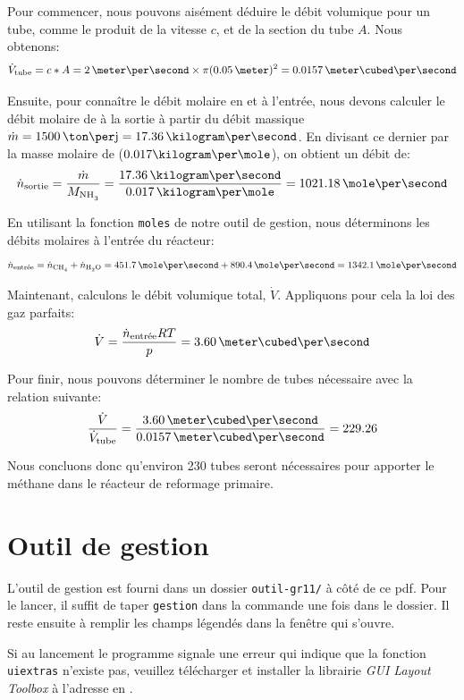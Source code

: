 Pour commencer, nous pouvons aisément déduire le débit volumique pour un tube,
comme le produit de la vitesse $c$, et de la section du tube $A$.
Nous obtenons:
\begin{equation*}
\dot{V}\ind{tube} = c*A = 2\,\meter\per\second \times \pi(0.05\,\meter)^2
= 0.0157\,\meter\cubed\per\second
\end{equation*}

Ensuite, pour connaître le débit molaire en  et  à l'entrée, nous devons calculer le débit molaire de  à la sortie
à partir du débit massique $\dot{m} = 1500\,\ton\per\jour = 17.36\,\kilogram\per\second$.
En divisant ce dernier par la masse molaire de  ($0.017\kilogram\per\mole$),
on obtient un débit de:
\begin{equation*}
\dot{n}\ind{sortie} = \frac{\dot{m}}{M_{\ce{NH3}}}
= \frac{17.36\,\kilogram\per\second}{0.017\,\kilogram\per\mole}
= 1021.18\,\mole\per\second
\end{equation*}

En utilisant la fonction \texttt{moles} de notre outil de gestion,
nous déterminons les débits molaires à l'entrée du réacteur:
\begin{equation*}
\dot{n}\ind{entrée} =  \dot{n}\ind{\ce{CH4}}+ \dot{n}\ind{\ce{H2O}}=451.7\,\mole\per\second + 890.4\,\mole\per\second = 1342.1 \,\mole\per\second
\end{equation*}

Maintenant, calculons le débit volumique total, $\dot{V}$.
Appliquons pour cela la loi des gaz parfaits:
\begin{equation*}
\dot{V} = \frac{\dot{n}\ind{entrée}RT}{p} = 3.60\,\meter\cubed\per\second
\end{equation*}

Pour finir, nous pouvons déterminer
le nombre de tubes nécessaire avec la relation suivante:
\begin{equation*}
\frac{\dot{V}}{\dot{V}\ind{tube}}
= \frac{3.60\,\meter\cubed\per\second}{0.0157\,\meter\cubed\per\second} = 229.26
\end{equation*}

Nous concluons donc qu'environ 230 tubes seront nécessaires pour apporter le méthane
dans le réacteur de reformage primaire.

\section{Outil de gestion}

L'outil de gestion est fourni dans un dossier \texttt{outil-gr11/}
à côté de ce pdf.
Pour le lancer, il suffit de taper \texttt{gestion} dans la commande 
\matlab{} une fois dans le dossier.
Il reste ensuite à remplir les champs légendés
dans la fenêtre qui s'ouvre.

Si au lancement le programme signale une erreur qui indique que la fonction
\texttt{uiextras} n'existe pas, veuillez télécharger et installer la librairie
\emph{GUI Layout Toolbox} à l'adresse en \cite{guilayout}.
